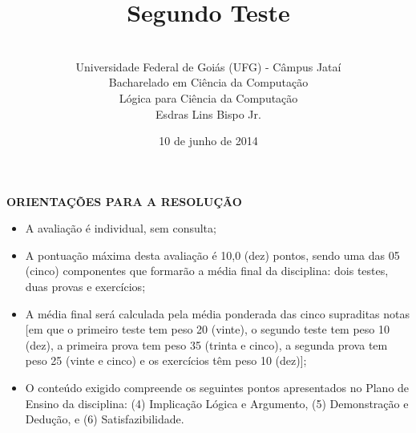 \documentclass[11pt,a4paper,oneside]{article}
\author{\\Universidade Federal de Goiás (UFG) - Câmpus Jataí\\Bacharelado em Ciência da Computação \\Lógica para Ciência da Computação \\Esdras Lins Bispo Jr.}
\title{\sc \huge Segundo Teste}
\date{10 de junho de 2014}
\begin{document}
\maketitle

{\bf ORIENTAÇÕES PARA A RESOLUÇÃO}

\begin{itemize}
	\item A avaliação é individual, sem consulta;
	\item A pontuação máxima desta avaliação é 10,0 (dez) pontos, sendo uma das 05 (cinco) componentes que formarão a média final da disciplina: dois testes, duas provas e exercícios;
	\item A média final será calculada pela média ponderada das cinco supraditas notas [em que o primeiro teste tem peso 20 (vinte), o segundo teste tem peso 10 (dez), a primeira prova tem peso 35 (trinta e cinco), a segunda prova tem peso 25 (vinte e cinco) e os exercícios têm peso 10 (dez)];
	\item O conteúdo exigido compreende os seguintes pontos apresentados no Plano de Ensino da disciplina: (4) Implicação Lógica e Argumento, (5) Demonstração e Dedução, e (6) Satisfazibilidade.
\end{itemize}

\begin{center}
\end{center}

\newpage
\end{document}
